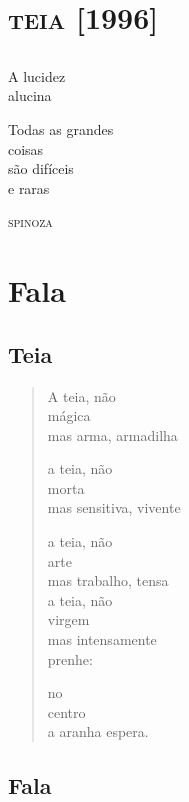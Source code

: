 \part{\textsc{teia} {[}1996{]}}

\chapter*{}
\thispagestyle{empty}
\mbox{}

\vspace*{\fill}
\hfill A lucidez\\
\hfill alucina

\bigskip

\epigraph{Todas as grandes\\
coisas\\
são difíceis\\
e raras}{\textsc{spinoza}}
\vspace*{\fill}

\part*{Fala}

\chapter{Teia}

\begin{verse}
A teia, não\\
mágica\\
mas arma, armadilha

a teia, não\\
morta\\
mas sensitiva, vivente

a teia, não\\
arte\\
mas trabalho, tensa\\

a teia, não\\
virgem\\
mas intensamente\\
\qquad\qquad prenhe:

no\\
centro\\
a aranha espera.
\end{verse}

\chapter{Fala}

